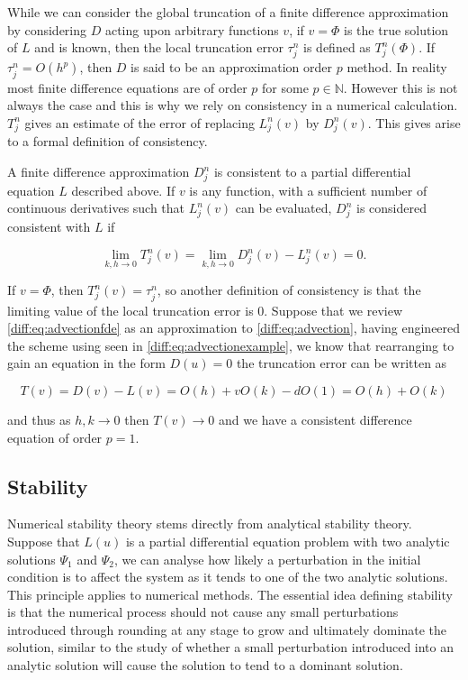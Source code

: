 \documentclass[../main.tex]{subfiles}
\begin{document}
  While we can consider the global truncation of a finite difference approximation by considering $D$ acting upon arbitrary functions $v$, if $v = \Phi$ is the true solution of $L$ and is known, then the local truncation error $\tau^n_j$ is defined as $T^n_j(\Phi)$. If $\tau^n_j = O(h^p)$, then $D$ is said to be an approximation order $p$ method. In reality most finite difference equations are of order $p$ for some $p \in \mathbb{N}$. However this is not always the case and this is why we rely on consistency in a numerical calculation. $T^n_j$ gives an estimate of the error of replacing $L^n_j(v)$ by $D^n_j(v)$. This gives arise to a formal definition of consistency.

  \begin{definition}[Consistency]
    A finite difference approximation $D^n_j$ is consistent to a partial differential equation $L$ described above. If $v$ is any function, with a sufficient number of continuous derivatives such that $L^n_j(v)$ can be evaluated, $D^n_j$ is considered consistent with $L$ if

    \begin{equation}
      \lim_{k, h \to 0} T^n_j(v) = \lim_{k, h \to 0} D^n_j(v) - L^n_j(v) = 0.
    \end{equation}
  \end{definition}

  If $v = \Phi$, then $T^n_j(v) = \tau^n_j$, so another definition of consistency is that the limiting value of the local truncation error is $0$. Suppose that we review \autoref{diff:eq:advectionfde} as an approximation to \autoref{diff:eq:advection}, having engineered the scheme using \cite{fornberg1988} seen in \autoref{diff:eq:advectionexample}, we know that rearranging to gain an equation in the form $D(u) = 0$ the truncation error can be written as

  \begin{equation}
    T(v) = D(v) - L(v) = O(h) + v O(k) - d O(1) = O(h) + O(k)
  \end{equation}

  and thus as $h, k \to 0$ then $T(v) \to 0$ and we have a consistent difference equation of order $p = 1$.

  \subsection{Stability}
  Numerical stability theory stems directly from analytical stability theory. Suppose that $L(u)$ is a partial differential equation problem with two analytic solutions $\Psi_1$ and $\Psi_2$, we can analyse how likely a perturbation in the initial condition is to affect the system as it tends to one of the two analytic solutions. This principle applies to numerical methods. The essential idea defining stability is that the numerical process should not cause any small perturbations introduced through rounding at any stage to grow and ultimately dominate the solution, similar to the study of whether a small perturbation introduced into an analytic solution will cause the solution to tend to a dominant solution.
\end{document}
